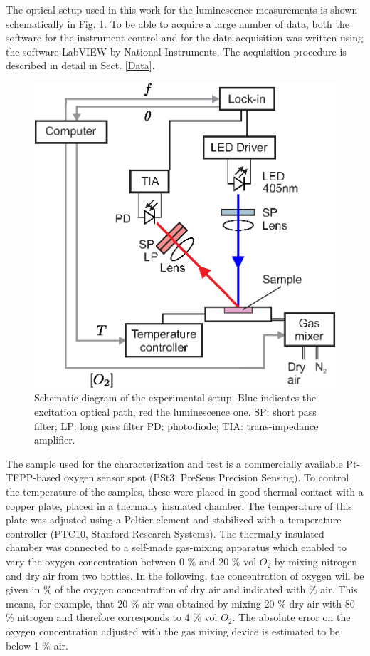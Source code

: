\documentclass[9pt,twocolumn,twoside,pdftex]{optica}
\begin{document}
The optical setup used in this work for the luminescence measurements is shown schematically in Fig. \ref{fig:setup}. To be able to acquire a large number of data, both the software for the instrument control and for the data acquisition was written using the software LabVIEW by National Instruments. The acquisition procedure is described in detail in Sect. \ref{Data}.

\begin{figure}[htbp]
\centering
\includegraphics[keepaspectratio, width=8.5 cm]{Setup_auto.eps}
\caption{Schematic diagram of the experimental setup. Blue indicates the excitation optical path, red the luminescence one. SP: short pass filter; LP: long pass filter PD: photodiode; TIA: trans-impedance amplifier.}
\label{fig:setup}
\end{figure}

The sample used for the characterization and test is a commercially available Pt-TFPP-based oxygen sensor spot (PSt3, PreSens Precision Sensing).
To control the temperature of the samples, these were placed in good thermal contact with a copper plate, placed in a thermally insulated chamber. The temperature of this plate was adjusted using a Peltier element and stabilized with a temperature controller (PTC10, Stanford Research Systems). The thermally insulated chamber was connected to a self-made gas-mixing apparatus which enabled to vary the oxygen concentration between 0 $\%$ and 20 $\%$ vol $O_2$ by mixing nitrogen and dry air from two bottles. In the following, the concentration of oxygen will be given in $\%$ of the oxygen concentration of dry air and indicated with $\%$ air. This means, for example, that 20 $\%$ air was obtained by mixing 20 $\%$ dry air with 80 $\%$ nitrogen and therefore corresponds to 4 $\%$ vol $O_2$. The absolute error on the oxygen concentration adjusted with the gas mixing device is estimated to be below 1 $\%$ air. 
 
\end{document}
